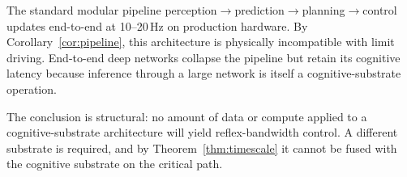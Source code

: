 \documentclass[11pt,twocolumn]{article}
\theoremstyle{definition}
\theoremstyle{remark}
\begin{document}
The standard modular pipeline perception$\to$prediction$\to$planning$\to$control \cite{thrun2006stanley,urmson2008boss,levinson2011junior} updates end-to-end at 10--20\,Hz on production hardware. By Corollary~\ref{cor:pipeline}, this architecture is physically incompatible with limit driving. End-to-end deep networks \cite{bojarski2016endtoend,bansal2019chauffeurnet,codevilla2018endtoend} collapse the pipeline but retain its cognitive latency because inference through a large network is itself a cognitive-substrate operation.

The conclusion is structural: no amount of data or compute applied to a cognitive-substrate architecture will yield reflex-bandwidth control. A different substrate is required, and by Theorem~\ref{thm:timescale} it cannot be fused with the cognitive substrate on the critical path.
\end{document}
